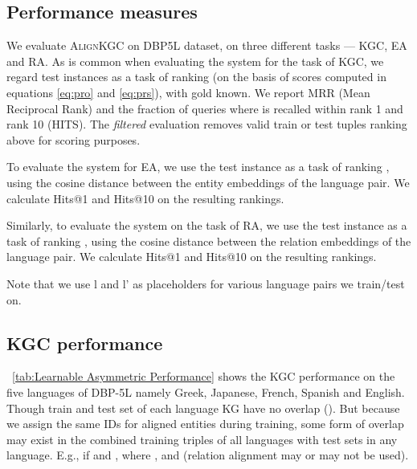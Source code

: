 \documentclass[11pt]{article}
\def\shortname{\textsc{Align\-KGC}}
\begin{document}
\subsection{Performance measures}
 
We evaluate \shortname{} on DBP5L dataset, on three different tasks --- KGC, EA and RA. As is common when evaluating the system for the task of KGC, we regard test instances   as a task of ranking  (on the basis of scores computed in equations \eqref{eq:pro} and \eqref{eq:prs}), with gold  known. We report MRR (Mean Reciprocal Rank) and the fraction of queries where  is recalled within rank 1 and rank 10 (HITS). The \emph{filtered} evaluation removes valid train or test tuples ranking above  for scoring purposes.



To evaluate the system for EA, we use the test instance   as a task of ranking , using the cosine distance between the entity embeddings of the language pair. We calculate Hits@1 and Hits@10 on the resulting rankings.

\iffalse
we use half of seed alignments not used while training to get aligned entity pairs  where  and .  Now we ask the equivalence query  and rank all entities in  using cosine similarity.  We calculate Hits@1 and Hits@10 on the resulting rankings.
\fi

Similarly, to evaluate the system on the task of RA, we use the test instance   as a task of ranking , using the cosine distance between the relation embeddings of the language pair. We calculate Hits@1 and Hits@10 on the resulting rankings.

Note that we use l and l' as placeholders for various language pairs we train/test on.
\iffalse
we have relation alignment on queries  and rank relations using cosine similarity. We calculate Hits@1 and Hits@3.  Because relation candidates are far fewer in number, Hits@10 is not a reliable measure for RA.
\fi
 


\subsection{KGC performance}

\tablename~\ref{tab:Learnable Asymmetric Performance} shows the KGC performance on the five languages of DBP-5L namely Greek, Japanese, French, Spanish and English.
Though train and test set of each language KG have no overlap (). 
But because we assign the same IDs for aligned entities during training, some form of overlap may exist in the combined training triples of all languages with test sets in any language.  E.g.,  if  and , where ,  and  (relation alignment may or may not be used).
\end{document}
